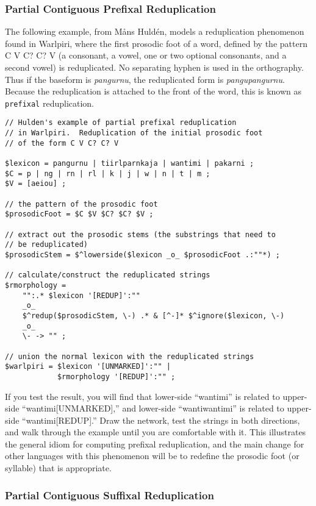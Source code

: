 \subsubsection{Partial Contiguous Prefixal Reduplication}

The following example, from M\r{a}ns Huldén, models a reduplication
phenomenon found in Warlpiri,
where the first prosodic foot of a word, defined by the pattern C V C? C? V (a consonant, a vowel,
one or two optional consonants, and a second vowel) is reduplicated.  No separating
hyphen is used in the orthography.  Thus if the
baseform is \emph{pangurnu}, the reduplicated form is \emph{pangupangurnu}.  Because the
reduplication is attached to the front of the word, this is known as \verb!prefixal!
reduplication.

\begin{Verbatim}
// Hulden's example of partial prefixal reduplication 
// in Warlpiri.  Reduplication of the initial prosodic foot 
// of the form C V C? C? V

$lexicon = pangurnu | tiirlparnkaja | wantimi | pakarni ;
$C = p | ng | rn | rl | k | j | w | n | t | m ;
$V = [aeiou] ;

// the pattern of the prosodic foot
$prosodicFoot = $C $V $C? $C? $V ;

// extract out the prosodic stems (the substrings that need to
// be reduplicated)
$prosodicStem = $^lowerside($lexicon _o_ $prosodicFoot .:""*) ;

// calculate/construct the reduplicated strings
$rmorphology = 
    "":.* $lexicon '[REDUP]':""
    _o_
    $^redup($prosodicStem, \-) .* & [^-]* $^ignore($lexicon, \-)
    _o_
    \- -> "" ;

// union the normal lexicon with the reduplicated strings
$warlpiri = $lexicon '[UNMARKED]':"" | 
            $rmorphology '[REDUP]':"" ;
\end{Verbatim}

If you test the result, you will find that lower-side ``wantimi'' is related to upper-side ``wantimi[UNMARKED],'' and
lower-side ``wantiwantimi'' is related to upper-side ``wantimi[REDUP].''  Draw the network, test the
strings in both directions, and walk through the example until you are comfortable with it.  This
illustrates the general idiom for computing prefixal reduplication, and the main change for other languages
with this phenomenon will be to redefine the prosodic foot (or syllable) that is appropriate.


\subsubsection{Partial Contiguous Suffixal Reduplication}

